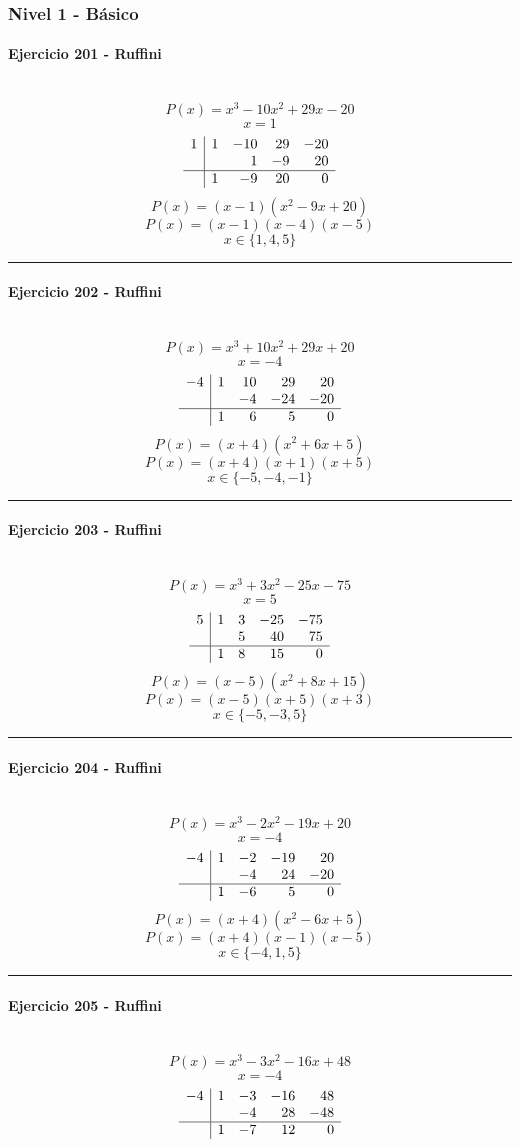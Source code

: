 \documentclass[10pt,a4paper]{article}
\newcommand{\res}[1]{\paragraph{#1}\mbox{}\\[-1.2em]}
\begin{document}
\subsubsection*{Nivel 1 - Básico}
\res{Ejercicio 201 - Ruffini}
\[ P(x)=x^{3} - 10 x^{2} + 29 x - 20 \]
\[ x=1 \]
\[\begin{array}{r|rrrr}1 & 1 & -10 & 29 & -20\\  &  & 1 & -9 & 20\\\hline  & 1 & -9 & 20 & 0\end{array}\]
\[ P(x)=(x-1)(x^{2} - 9 x + 20) \]
\[ P(x)=(x-1)(x-4)(x-5) \]
\[ \boxed{x\in\{1,4,5\}} \]
\vspace{1mm}\hrule\vspace{2mm}
\res{Ejercicio 202 - Ruffini}
\[ P(x)=x^{3} + 10 x^{2} + 29 x + 20 \]
\[ x=-4 \]
\[\begin{array}{r|rrrr}-4 & 1 & 10 & 29 & 20\\  &  & -4 & -24 & -20\\\hline  & 1 & 6 & 5 & 0\end{array}\]
\[ P(x)=(x+4)(x^{2} + 6 x + 5) \]
\[ P(x)=(x+4)(x+1)(x+5) \]
\[ \boxed{x\in\{-5,-4,-1\}} \]
\vspace{1mm}\hrule\vspace{2mm}
\res{Ejercicio 203 - Ruffini}
\[ P(x)=x^{3} + 3 x^{2} - 25 x - 75 \]
\[ x=5 \]
\[\begin{array}{r|rrrr}5 & 1 & 3 & -25 & -75\\  &  & 5 & 40 & 75\\\hline  & 1 & 8 & 15 & 0\end{array}\]
\[ P(x)=(x-5)(x^{2} + 8 x + 15) \]
\[ P(x)=(x-5)(x+5)(x+3) \]
\[ \boxed{x\in\{-5,-3,5\}} \]
\vspace{1mm}\hrule\vspace{2mm}
\res{Ejercicio 204 - Ruffini}
\[ P(x)=x^{3} - 2 x^{2} - 19 x + 20 \]
\[ x=-4 \]
\[\begin{array}{r|rrrr}-4 & 1 & -2 & -19 & 20\\  &  & -4 & 24 & -20\\\hline  & 1 & -6 & 5 & 0\end{array}\]
\[ P(x)=(x+4)(x^{2} - 6 x + 5) \]
\[ P(x)=(x+4)(x-1)(x-5) \]
\[ \boxed{x\in\{-4,1,5\}} \]
\vspace{1mm}\hrule\vspace{2mm}
\res{Ejercicio 205 - Ruffini}
\[ P(x)=x^{3} - 3 x^{2} - 16 x + 48 \]
\[ x=-4 \]
\[\begin{array}{r|rrrr}-4 & 1 & -3 & -16 & 48\\  &  & -4 & 28 & -48\\\hline  & 1 & -7 & 12 & 0\end{array}\]
\end{document}
